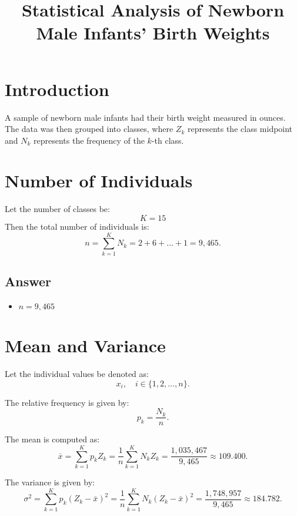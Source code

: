 \documentclass[a4paper,12pt]{article}
\title{Statistical Analysis of Newborn Male Infants' Birth Weights}
\author{}
\date{}
\begin{document}
\maketitle

\section{Introduction}
A sample of newborn male infants had their birth weight measured in ounces. The data was then grouped into classes, where $Z_k$ represents the class midpoint and $N_k$ represents the frequency of the $k$-th class.

\section{Number of Individuals}
Let the number of classes be:
\begin{equation}
K = 15
\end{equation}
Then the total number of individuals is:
\begin{equation}
n = \sum_{k=1}^{K} N_k = 2+6+\dots+1 = 9,465.
\end{equation}

\subsection*{Answer}
\begin{itemize}
    \item $n = 9,465$
\end{itemize}

\section{Mean and Variance}
Let the individual values be denoted as:
\begin{equation}
x_i, \quad i \in \{1,2,\dots,n\}.
\end{equation}

The relative frequency is given by:
\begin{equation}
p_k = \frac{N_k}{n}.
\end{equation}

The mean is computed as:
\begin{equation}
\bar{x} = \sum_{k=1}^{K} p_k Z_k = \frac{1}{n} \sum_{k=1}^{K} N_k Z_k = \frac{1,035,467}{9,465} \approx 109.400.
\end{equation}

The variance is given by:
\begin{equation}
\sigma^2 = \sum_{k=1}^{K} p_k (Z_k - \bar{x})^2 = \frac{1}{n} \sum_{k=1}^{K} N_k (Z_k - \bar{x})^2 = \frac{1,748,957}{9,465} \approx 184.782.
\end{equation}
\end{document}
